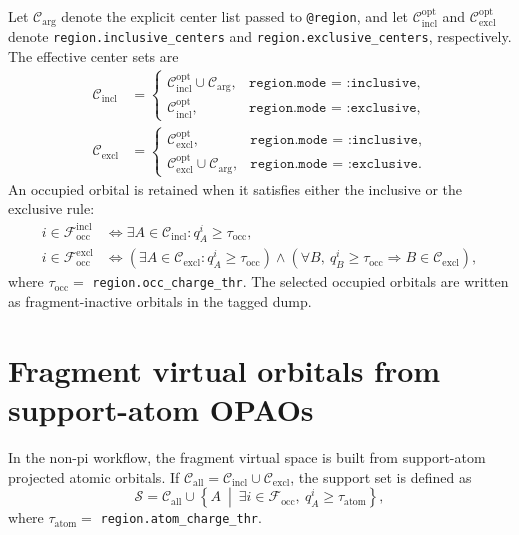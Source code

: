 \documentclass[a4paper,12pt,oneside]{book}
\newcommand{\cmd}[1]{\texttt{#1}}
\begin{document}
Let $\mathcal{C}_{\mathrm{arg}}$ denote the explicit center list passed to \cmd{@region}, and let
$\mathcal{C}_{\mathrm{incl}}^{\mathrm{opt}}$ and $\mathcal{C}_{\mathrm{excl}}^{\mathrm{opt}}$ denote
\cmd{region.inclusive\_centers} and \cmd{region.exclusive\_centers}, respectively.
The effective center sets are
\begin{align}
  \mathcal{C}_{\mathrm{incl}} &=
  \begin{cases}
    \mathcal{C}_{\mathrm{incl}}^{\mathrm{opt}} \cup \mathcal{C}_{\mathrm{arg}}, & \cmd{region.mode = :inclusive}, \\
    \mathcal{C}_{\mathrm{incl}}^{\mathrm{opt}}, & \cmd{region.mode = :exclusive},
  \end{cases} \\
  \mathcal{C}_{\mathrm{excl}} &=
  \begin{cases}
    \mathcal{C}_{\mathrm{excl}}^{\mathrm{opt}}, & \cmd{region.mode = :inclusive}, \\
    \mathcal{C}_{\mathrm{excl}}^{\mathrm{opt}} \cup \mathcal{C}_{\mathrm{arg}}, & \cmd{region.mode = :exclusive}.
  \end{cases}
\end{align}
An occupied orbital is retained when it satisfies either the inclusive or the exclusive rule:
\begin{align}
  i \in \mathcal{F}_{\mathrm{occ}}^{\mathrm{incl}} &\iff \exists A \in \mathcal{C}_{\mathrm{incl}} : q_A^i \ge \tau_{\mathrm{occ}}, \\
  i \in \mathcal{F}_{\mathrm{occ}}^{\mathrm{excl}} &\iff \left(\exists A \in \mathcal{C}_{\mathrm{excl}} : q_A^i \ge \tau_{\mathrm{occ}}\right) \wedge
  \left(\forall B,\ q_B^i \ge \tau_{\mathrm{occ}} \Rightarrow B \in \mathcal{C}_{\mathrm{excl}}\right),
\end{align}
where $\tau_{\mathrm{occ}} =$ \cmd{region.occ\_charge\_thr}.
The selected occupied orbitals are written as fragment-inactive orbitals in the tagged dump.

\section{Fragment virtual orbitals from support-atom OPAOs}

In the non-pi workflow, the fragment virtual space is built from support-atom projected atomic orbitals.
If $\mathcal{C}_{\mathrm{all}} = \mathcal{C}_{\mathrm{incl}} \cup \mathcal{C}_{\mathrm{excl}}$, the support set is defined as
\begin{equation}
  \mathcal{S} = \mathcal{C}_{\mathrm{all}} \cup \left\{A\ \middle|\ \exists i \in \mathcal{F}_{\mathrm{occ}},\ q_A^i \ge \tau_{\mathrm{atom}}\right\},
\end{equation}
where $\tau_{\mathrm{atom}} =$ \cmd{region.atom\_charge\_thr}.
\end{document}
